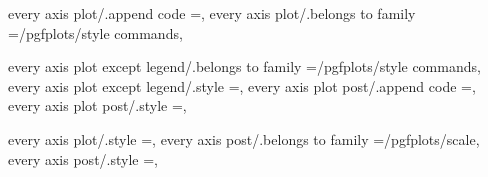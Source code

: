 {{{every axis plot/.append code                                       ={},                                                                            
every axis plot/.belongs to family                                 =/pgfplots/style commands,                                                                                                          

every axis plot except legend/.belongs to family                   =/pgfplots/style commands,                                                                                                          
every axis plot except legend/.style                               ={},                                                                                                                                
every axis plot post/.append code                                  ={},                                                                            
every axis plot post/.style                                        ={},                                                                                                                                

every axis plot/.style                                             ={},                                                                                                                                
every axis post/.belongs to family                                 =/pgfplots/scale,                                                                                                                   
every axis post/.style                                             ={},                                                                                                                                

}}}
